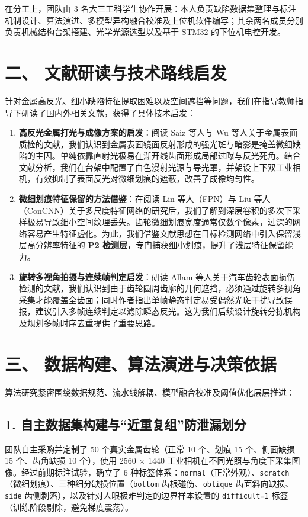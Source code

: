 在分工上，团队由 3 名大三工科学生协作开展：本人负责缺陷数据集整理与标注机制设计、算法演进、多模型异构融合校准及上位机软件编写；其余两名成员分别负责机械结构台架搭建、光学光源选型以及基于 STM32 的下位机电控开发。

\section*{二、 文献研读与技术路线启发}

针对金属高反光、细小缺陷特征提取困难以及空间遮挡等问题，我们在指导教师指导下研读了国内外相关文献，获得了具体技术启发：

\begin{enumerate}
    \item \textbf{高反光金属打光与成像方案的启发}：阅读 Saiz 等人与 Wu 等人关于金属表面质检的文献，我们认识到金属表面镜面反射形成的强光斑与暗影是掩盖微细缺陷的主因。单纯依靠直射光极易在渐开线齿面形成局部过曝与反光死角。结合文献分析，我们在台架中配置了白色漫射光源与导光罩，并架设上下双工业相机，有效抑制了表面反光对微细划痕的遮蔽，改善了成像均匀性。
    \item \textbf{微细划痕特征保留的方法借鉴}：在阅读 Lin 等人（FPN）与 Liu 等人（ConCNN）关于多尺度特征网络的研究后，我们了解到深层卷积的多次下采样极易导致细小空间纹理丢失。齿轮微细划痕宽度通常仅数个像素，过深的网络容易产生特征虚化。为此，我们借鉴文献思想在目标检测网络中引入保留浅层高分辨率特征的 \textbf{P2 检测层}，专门捕获细小划痕，提升了浅层特征保留能力。
    \item \textbf{旋转多视角拍摄与连续帧判定启发}：研读 Allam 等人关于汽车齿轮表面损伤检测的文献，我们认识到由于齿轮圆周齿廓的几何遮挡，必须通过旋转多视角采集才能覆盖全齿面；同时作者指出单帧静态判定易受偶然光斑干扰导致误报，建议引入多帧连续判定以滤除瞬态反光。这为我们后续设计旋转分拣机构及规划多帧时序去重提供了重要思路。
\end{enumerate}

\section*{三、 数据构建、算法演进与决策依据}

算法研究紧密围绕数据规范、流水线解耦、模型融合校准及阈值优化层层推进：

\subsection*{1. 自主数据集构建与“近重复组”防泄漏划分}
团队自主采购并定制了 50 个真实金属齿轮（正常 10 个、划痕 15 个、侧面缺损 15 个、齿角缺损 10 个），使用 2560 $\times$ 1440 工业相机在不同光照与角度下采集图像。经过前期标注试验，确立了 6 种标签体系：\texttt{normal}（正常外观）、\texttt{scratch}（微细划痕）、三种细分缺损位置（\texttt{bottom} 齿根碰伤、\texttt{oblique} 齿面斜向缺损、\texttt{side} 齿侧剥落），以及针对人眼极难判定的边界样本设置的 \texttt{difficult=1} 标签（训练阶段剔除，避免梯度震荡）。

